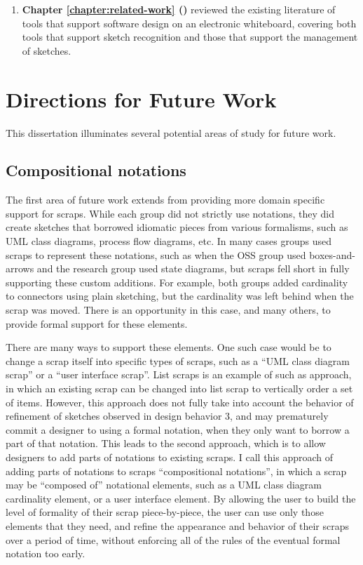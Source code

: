 \documentclass[12pt,fleqn]{ucithesis}
\begin{document}
\begin{enumerate}
   \item \textbf{Chapter \ref{chapter:related-work} ()} reviewed the existing literature of tools that support software design on an electronic whiteboard, covering both tools that support sketch recognition and those that support the management of sketches.
 \end{enumerate}

\section{Directions for Future Work}
This dissertation illuminates several potential areas of study for future work. 

\subsection{Compositional notations}

The first area of future work extends from providing more domain specific support for scraps. While each group did not strictly use notations, they did create sketches that borrowed idiomatic pieces from various formalisms, such as UML class diagrams, process flow diagrams, etc. In many cases groups used scraps to represent these notations, such as when the OSS group used boxes-and-arrows and the research group used state diagrams, but scraps fell short in fully supporting these custom additions. For example, both groups added cardinality to connectors using plain sketching, but the cardinality was left behind when the scrap was moved. There is an opportunity in this case, and many others, to provide formal support for these elements. 

There are many ways to support these elements. One such case would be to change a scrap itself into specific types of scraps, such as a ``UML class diagram scrap'' or a ``user interface scrap''. List scraps is an example of such as approach, in which an existing scrap can be changed into list scrap to vertically order a set of items. However, this approach does not fully take into account the behavior of refinement of sketches observed in design behavior 3, and may prematurely commit a designer to using a formal notation, when they only want to borrow a part of that notation. This leads to the second approach, which is to allow designers to add parts of notations to existing scraps. I call this approach of adding parts of notations to scraps ``compositional notations'', in which a scrap may be ``composed of'' notational elements, such as a UML class diagram cardinality element, or a user interface element. By allowing the user to build the level of formality of their scrap piece-by-piece, the user can use only those elements that they need, and refine the appearance and behavior of their scraps over a period of time, without enforcing all of the rules of the eventual formal notation too early. 
\end{document}
